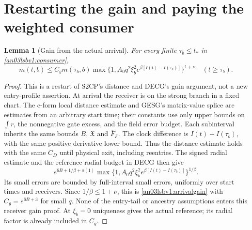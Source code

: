 \documentclass[11pt]{article}
\newtheorem{lemma}[theorem]{Lemma}
\theoremstyle{remark}\newtheorem{remark}[theorem]{Remark}
\begin{document}
\section{Restarting the gain and paying the weighted consumer}
\begin{lemma}[Gain from the actual arrival]
\label{an03lsbv1:restart}
For every finite $\tau_b\le t_*$ in \eqref{an03lsbv1:consumer},
\begin{equation}
 m(t,b)\le C_gm(\tau_b,b)
 \max\{1,A_0q^2\xi_b^2e^{\beta[I(t)-I(\tau_b)]}\}^{1+\nu}
 \quad(t\ge\tau_b).
 \label{an03lsbv1:arrivalgain}
\end{equation}
\end{lemma}
\begin{proof}
This is a restart of S2CP's distance and DECG's gain argument,
not a new entry-profile assertion. At arrival the receiver is on
the strong branch in a fixed chart. The c-form local distance
estimate and GESG's matrix-value splice are estimates from an
arbitrary start time; their constants use only upper bounds on
$\int r$, the nonnegative gate excess, and the field error budget.
Each subinterval inherits the same bounds $B$, $\mathfrak X$ and
$\overline F_F$. The clock difference is $I(t)-I(\tau_b)$, with
the same positive derivative lower bound. Thus the distance
estimate holds with the same $C_D$ until physical exit, including
reentries. The signed radial estimate and the reference radial
budget in DECG then give
\[
 e^{6B+1/\beta+o(1)}
 \max\{1,A_0q^2\xi_b^2e^{\beta[I(t)-I(\tau_b)]}\}^{1/\beta}.
\]
Its small errors are bounded by full-interval small errors, uniformly
over start times and receivers. Since $1/\beta\le1+\nu$, this is
\eqref{an03lsbv1:arrivalgain} with $C_g=e^{6B+3}$ for small $q$.
None of the entry-tail or ancestry assumptions enters this receiver
gain proof. At $\xi_b=0$ uniqueness gives the actual reference;
its radial factor is already included in $C_g$.
\end{proof}
\end{document}
